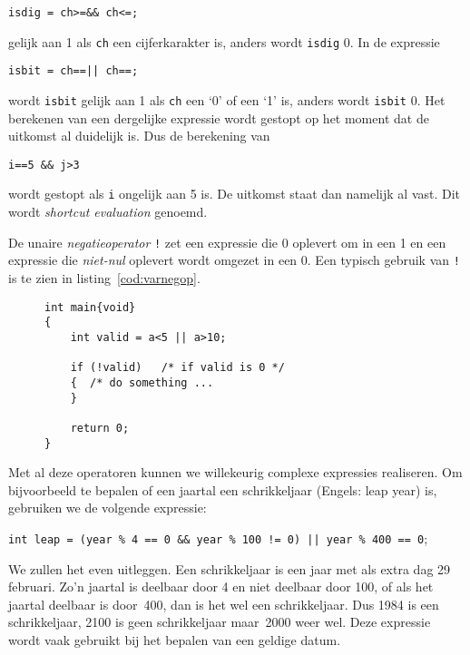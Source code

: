 \hspace*{1em}\texttt{isdig = ch>=\textquotesingle \&\& ch<=\textquotesingle;}

gelijk aan 1 als \texttt{ch} een cijferkarakter is, anders wordt \texttt{isdig} 0. In de expressie

\hspace*{1em}\texttt{isbit = ch==\textquotesingle || ch==\textquotesingle;}

wordt \texttt{isbit} gelijk aan 1 als \texttt{ch} een `0' of een `1' is, anders wordt \texttt{isbit} 0. Het berekenen van een dergelijke expressie wordt gestopt op het moment dat de uitkomst al duidelijk is. Dus de berekening van

\hspace*{1em}\texttt{i==5 \&\& j>3}

wordt gestopt als \texttt{i} ongelijk aan 5 is. De uitkomst staat dan namelijk al vast. Dit wordt \textsl{shortcut evaluation} genoemd.

De unaire \textsl{negatieoperator} \texttt{!} zet een expressie die 0 oplevert om in een 1 en een expressie die \textsl{niet-nul} oplevert wordt omgezet in een 0. Een typisch gebruik van \texttt{!} is te zien in listing~\ref{cod:varnegop}.

\begin{figure}[!ht]
\begin{lstlisting}[caption=Voorbeeld van de negatieoperator.,label=cod:varnegop]
int main{void}
{
    int valid = a<5 || a>10;

    if (!valid)   /* if valid is 0 */
    {  /* do something ...
    }

    return 0;
}
\end{lstlisting}
\end{figure}

Met al deze operatoren kunnen we willekeurig complexe expressies realiseren. Om bijvoorbeeld te bepalen of een jaartal een schrikkeljaar (Engels: leap year) is, gebruiken we de volgende expressie:

\hspace*{1em}\texttt{\small int leap = (year \% 4 == 0 \&\& year \% 100 != 0) || year \% 400 == 0};

We zullen het even uitleggen. Een schrikkeljaar is een jaar met als extra dag 29 februari. Zo'n jaartal is deelbaar door 4 en niet deelbaar door 100, of als het jaartal deelbaar is door~400, dan is het wel een schrikkeljaar. Dus 1984 is een schrikkeljaar, 2100 is geen schrikkeljaar maar~2000 weer wel. Deze expressie wordt vaak gebruikt bij het bepalen van een geldige datum.

